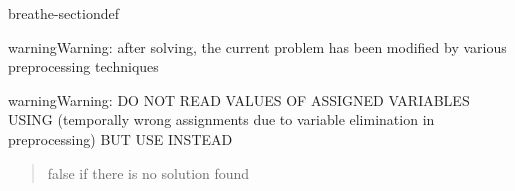 \documentclass[letterpaper,10pt,openany,oneside,english]{sphinxmanual}
\begin{document}
\begin{fulllineitems}
\begin{sphinxuseclass}{breathe-sectiondef}
\begin{fulllineitems}
\begin{sphinxadmonition}{warning}{Warning:}
\sphinxAtStartPar
after solving, the current problem has been modified by various preprocessing techniques 
\end{sphinxadmonition}

\begin{sphinxadmonition}{warning}{Warning:}
\sphinxAtStartPar
DO NOT READ VALUES OF ASSIGNED VARIABLES USING {\hyperref[\detokenize{ref/ref_cpp:classWeightedCSP_1a069e60ce059d61a833d66fcf360456df}]{}} (temporally wrong assignments due to variable elimination in preprocessing) BUT USE {\hyperref[\detokenize{ref/ref_cpp:classWeightedCSPSolver_1a745253dfb01452b95453cf77df2c7299}]{}} INSTEAD 
\end{sphinxadmonition}
\begin{quote}\begin{description}
\sphinxAtStartPar
false if there is no solution found 

\end{description}\end{quote}

\end{fulllineitems}


\begin{fulllineitems}
\label{\detokenize{ref/ref_cpp:_CPPv4N17WeightedCSPSolver10beginSolveE4Cost}}\label{\detokenize{ref/ref_cpp:_CPPv3N17WeightedCSPSolver10beginSolveE4Cost}}\label{\detokenize{ref/ref_cpp:_CPPv2N17WeightedCSPSolver10beginSolveE4Cost}}\label{\detokenize{ref/ref_cpp:WeightedCSPSolver::beginSolve__Cost}}
\pysigstartsignatures
\pysigstartmultiline
{}
\pysigstopmultiline
\pysigstopsignatures
\end{fulllineitems}



\end{sphinxuseclass}
\end{fulllineitems}
\end{document}
